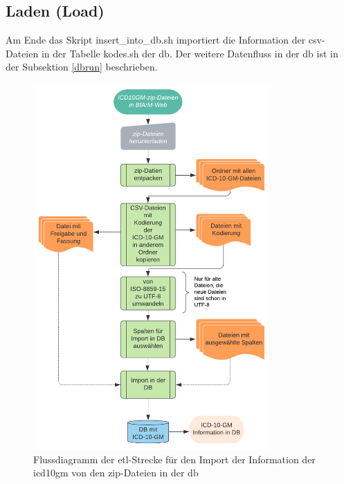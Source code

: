 \subsection{Laden (Load)}

Am Ende das Skript {\ttfamily insert\_into\_db.sh} importiert die Information der \ac{csv}-Dateien in der Tabelle {\ttfamily kodes.sh} der \ac{db}. Der weitere Datenfluss in der \ac{db} ist in der Subsektion \ref{dbrun} beschrieben.
\newpage
	\begin{figure}[ht]
		\centering
		\includegraphics[height=14cm]{figures/etl}
		\caption[\acs{etl}-Strecke]{Flussdiagramm der \acs{etl}-Strecke für den Import der Information der \ac{icd10gm} von den \ac{zip}-Dateien in der \ac{db} }
		\label{fig:etl}
	\end{figure} 
	